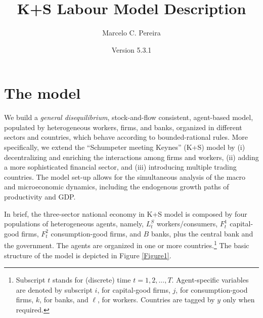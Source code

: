 \documentclass[a4paper,11pt]{article}
\title{K+S Labour Model Description}
\author{Marcelo C. Pereira}
\date{Version 5.3.1}
\begin{document}
\maketitle

\section{The model}
\label{Section:model}

We build a \emph{general disequilibrium}, stock-and-flow consistent, agent-based model, populated by heterogeneous workers, firms, and banks, organized in different sectors and countries, which behave according to bounded-rational rules. More specifically, we extend the ``Schumpeter meeting Keynes'' (K+S) model \citep{dosi2010schumpeter} by (i) decentralizing and enriching the interactions among firms and workers, (ii) adding a more sophisticated financial sector, and (iii) introducing multiple trading countries. The model set-up allows for the simultaneous analysis of the macro and microeconomic dynamics, including the endogenous growth paths of productivity and GDP.

In brief, the three-sector national economy in K+S model is composed by four populations of heterogeneous agents, namely, $L_t^S$ workers/consumers, $F_t^1$ capital-good firms, $F_t^2$ consumption-good firms, and $B$ banks, plus the central bank and the government. The agents are organized in one or more countries.\footnote{Subscript $t$ stands for (discrete) time $t=1,2,...,T$. Agent-specific variables are denoted by subscript $i$, for capital-good firms, $j$, for consumption-good firms, $k$, for banks, and $\ell$, for workers. Countries are tagged by $y$ only when required.} The basic structure of the model is depicted in Figure \ref{Figure1}.
\end{document}

